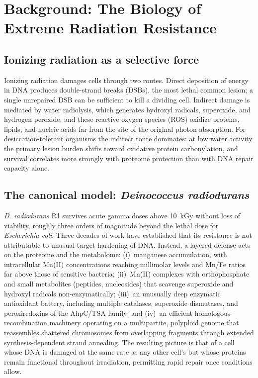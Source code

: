\section{Background: The Biology of Extreme Radiation Resistance}
\label{sec:background}

\subsection{Ionizing radiation as a selective force}
Ionizing radiation damages cells through two routes. Direct deposition of
energy in DNA produces double-strand breaks (DSBs), the most lethal common
lesion; a single unrepaired DSB can be sufficient to kill a dividing cell.
Indirect damage is mediated by water radiolysis, which generates hydroxyl
radicals, superoxide, and hydrogen peroxide, and these reactive oxygen
species (ROS) oxidize proteins, lipids, and nucleic acids far from the site
of the original photon absorption. For desiccation-tolerant organisms the
indirect route dominates: at low water activity the primary lesion burden
shifts toward oxidative protein carbonylation, and survival correlates more
strongly with proteome protection than with DNA repair capacity alone.

\subsection{The canonical model: \emph{Deinococcus radiodurans}}
\emph{D. radiodurans} R1 survives acute gamma doses above 10~kGy without
loss of viability, roughly three orders of magnitude beyond the lethal dose
for \emph{Escherichia coli}. Three decades of work have established that its
resistance is not attributable to unusual target hardening of DNA. Instead,
a layered defense acts on the proteome and the metabolome: (i)~manganese
accumulation, with intracellular Mn(II) concentrations reaching millimolar
levels and Mn/Fe ratios far above those of sensitive bacteria; (ii)~Mn(II)
complexes with orthophosphate and small metabolites (peptides, nucleosides)
that scavenge superoxide and hydroxyl radicals non-enzymatically; (iii)~an
unusually deep enzymatic antioxidant battery, including multiple catalases,
superoxide dismutases, and peroxiredoxins of the AhpC/TSA family; and
(iv)~an efficient homologous-recombination machinery operating on a
multipartite, polyploid genome that reassembles shattered chromosomes from
overlapping fragments through extended synthesis-dependent strand
annealing. The resulting picture is that of a cell whose DNA is damaged at
the same rate as any other cell's but whose proteins remain functional
throughout irradiation, permitting rapid repair once conditions allow.

